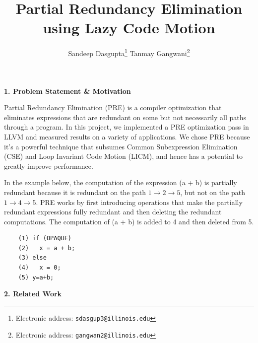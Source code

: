 \documentclass[10pt,twoside]{report}
\title{\textbf{Partial Redundancy Elimination using Lazy Code Motion}}
\author{Sandeep Dasgupta\thanks{Electronic address:
\texttt{sdasgup3@illinois.edu}} \qquad Tanmay Gangwani\thanks{Electronic
address: \texttt{gangwan2@illinois.edu}}}
\begin{document}
\begin{titlepage}
\thispagestyle{empty}
\maketitle
\pagebreak
\end{titlepage}

\begin{flushleft}
\textbf{\Large{1. Problem Statement \& Motivation}}
\end{flushleft}
Partial Redundancy Elimination (PRE) is a compiler optimization that eliminates
expressions that are redundant on some but not necessarily all paths through a
program. In this project, we implemented a PRE optimization pass in LLVM 
and measured results on a variety of applications. We chose PRE because
it's a powerful technique that subsumes Common Subexpression Elimination 
(CSE) and Loop Invariant Code Motion (LICM), and hence has a potential to 
greatly improve performance.

In the example below, the computation of the expression (a + b) is partially
redundant because it is redundant on the path $1 \rightarrow 2 \rightarrow 5$,
          but not on the path $1 \rightarrow 4 \rightarrow 5$. PRE works by first introducing
          operations that make the partially redundant expressions fully
          redundant and then deleting the redundant computations. The
          computation of (a + b) is added to 4 and then deleted from 5.


\lstset{ %
  basicstyle=\footnotesize, 
  breakatwhitespace=false,   
  breaklines=true,            
}
\begin{center}
\begin{lstlisting}
    (1) if (OPAQUE)
    (2)   x = a + b;
    (3) else
    (4)   x = 0;
    (5) y=a+b;
\end{lstlisting}
\end{center}


\begin{flushleft}
\textbf{\Large{2. Related Work}}
\end{flushleft}
\end{document}
